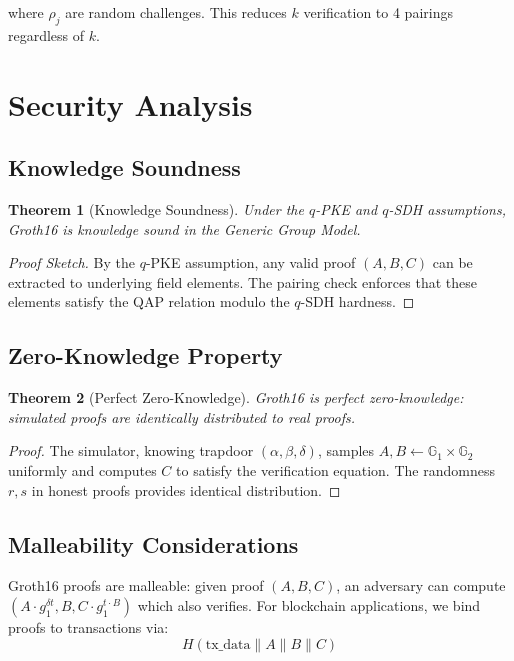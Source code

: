\documentclass[11pt,a4paper]{article}
\newtheorem{theorem}{Theorem}[section]
\newcommand{\G}{\mathbb{G}}
\begin{document}
where $\rho_j$ are random challenges. This reduces $k$ verification to 4 pairings regardless of $k$.

\section{Security Analysis}
\label{sec:security}

\subsection{Knowledge Soundness}

\begin{theorem}[Knowledge Soundness]
Under the $q$-PKE and $q$-SDH assumptions, Groth16 is knowledge sound in the Generic Group Model.
\end{theorem}

\begin{proof}[Proof Sketch]
By the $q$-PKE assumption, any valid proof $(A, B, C)$ can be extracted to underlying field elements. The pairing check enforces that these elements satisfy the QAP relation modulo the $q$-SDH hardness.
\end{proof}

\subsection{Zero-Knowledge Property}

\begin{theorem}[Perfect Zero-Knowledge]
Groth16 is perfect zero-knowledge: simulated proofs are identically distributed to real proofs.
\end{theorem}

\begin{proof}
The simulator, knowing trapdoor $(\alpha, \beta, \delta)$, samples $A, B \gets \G_1 \times \G_2$ uniformly and computes $C$ to satisfy the verification equation. The randomness $r, s$ in honest proofs provides identical distribution.
\end{proof}

\subsection{Malleability Considerations}

Groth16 proofs are malleable: given proof $(A, B, C)$, an adversary can compute $(A \cdot g_1^{\delta t}, B, C \cdot g_1^{t \cdot B})$ which also verifies. For blockchain applications, we bind proofs to transactions via:
\[
H(\text{tx\_data} \| A \| B \| C)
\]
\end{document}
